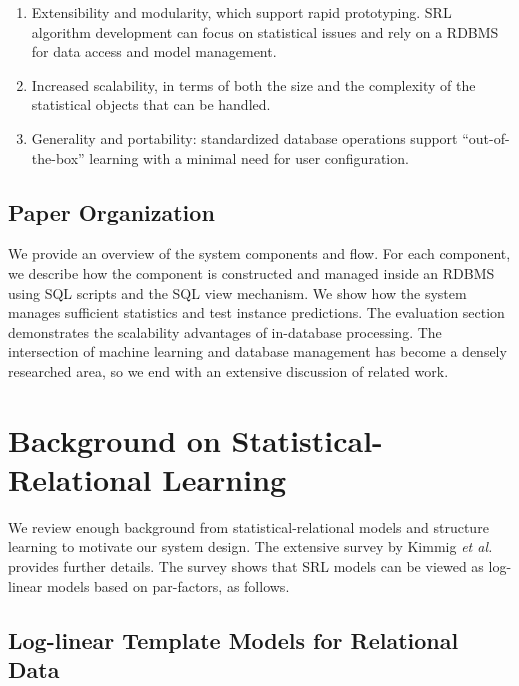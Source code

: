\documentclass{IEEEtran}
\begin{document}
\begin{enumerate}
\item Extensibility and modularity, which support rapid prototyping. SRL algorithm development can focus on statistical issues and rely on a RDBMS for data access and model management.
\item Increased scalability, in terms of both the size and the complexity of the statistical objects that can be handled.
\item Generality and portability: standardized database operations support ``out-of-the-box'' learning with a minimal need for user configuration.
\end{enumerate}
\subsection{Paper Organization}
We provide an overview of the system components and flow. For each component, we describe how the component is constructed and managed inside an RDBMS using SQL scripts and the SQL view mechanism. We show how the system manages sufficient statistics and test instance predictions. The evaluation section demonstrates the scalability advantages of in-database processing. The intersection of machine learning and database management has become a densely researched area, so we end with an extensive discussion of related work. 



\section{Background on Statistical-Relational Learning} We review enough background from statistical-relational models and structure learning to motivate our system design. The extensive survey by Kimmig {\em et al.} \cite{Kimmig2015} provides further details. The survey shows that SRL models can be viewed as log-linear models based on par-factors, as follows.

\subsection{Log-linear Template Models for Relational Data} \label{sec:log-linear}
\end{document}

